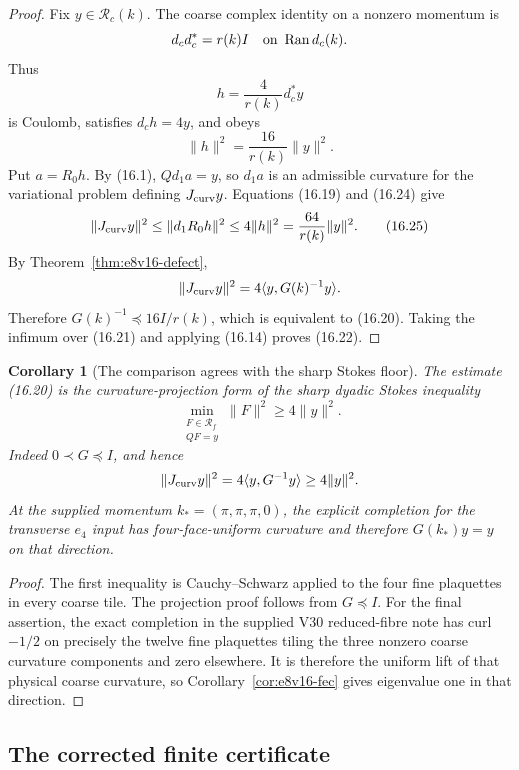 \documentclass[11pt,oneside]{book}
\newtheorem{corollary}[theorem]{Corollary}
\theoremstyle{definition}
\theoremstyle{remark}
\begin{document}
\begin{proof}
Fix \(y\in\mathcal R_c(k)\).  The coarse complex identity on a
nonzero momentum is
\[
 d_cd_c^*=r(k)I
       \quad\hbox{on }\operatorname{Ran}d_c(k).
\]
Thus
\[
                    h=\frac4{r(k)}d_c^*y                            \tag{16.23}
\]
is Coulomb, satisfies \(d_ch=4y\), and obeys
\[
                    \|h\|^2=\frac{16}{r(k)}\|y\|^2.                 \tag{16.24}
\]
Put \(a=R_0h\).  By (16.1), \(Qd_1a=y\), so \(d_1a\) is an admissible
curvature for the variational problem defining \(J_{\rm curv}y\).
Equations (16.19) and (16.24) give
\[
\|J_{\rm curv}y\|^2
\leq\|d_1R_0h\|^2
\leq4\|h\|^2
=\frac{64}{r(k)}\|y\|^2.                                           \tag{16.25}
\]
By Theorem~\ref{thm:e8v16-defect},
\[
 \|J_{\rm curv}y\|^2=4\langle y,G(k)^{-1}y\rangle.
\]
Therefore \(G(k)^{-1}\preceq16I/r(k)\), which is equivalent to
(16.20).  Taking the infimum over (16.21) and applying (16.14) proves
(16.22).
\end{proof}

\begin{corollary}[The comparison agrees with the sharp Stokes floor]
\label{cor:e8v16-stokes}
The estimate (16.20) is the curvature-projection form of the sharp
dyadic Stokes inequality
\[
 \min_{\substack{F\in\mathcal R_f\\QF=y}}\|F\|^2
 \geq4\|y\|^2.
\]
Indeed \(0\prec G\preceq I\), and hence
\[
 \|J_{\rm curv}y\|^2=4\langle y,G^{-1}y\rangle
 \geq4\|y\|^2.
\]
At the supplied momentum \(k_*=(\pi,\pi,\pi,0)\), the explicit
completion for the transverse \(e_4\) input has four-face-uniform
curvature and therefore \(G(k_*)y=y\) on that direction.
\end{corollary}

\begin{proof}
The first inequality is Cauchy--Schwarz applied to the four fine
plaquettes in every coarse tile.  The projection proof follows from
\(G\preceq I\).  For the final assertion, the exact completion in the
supplied V30 reduced-fibre note has curl \(-1/2\) on precisely the
twelve fine plaquettes tiling the three nonzero coarse curvature
components and zero elsewhere.  It is therefore the uniform lift of
that physical coarse curvature, so Corollary~\ref{cor:e8v16-fec}
gives eigenvalue one in that direction.
\end{proof}

\subsection{The corrected finite certificate}
\end{document}
